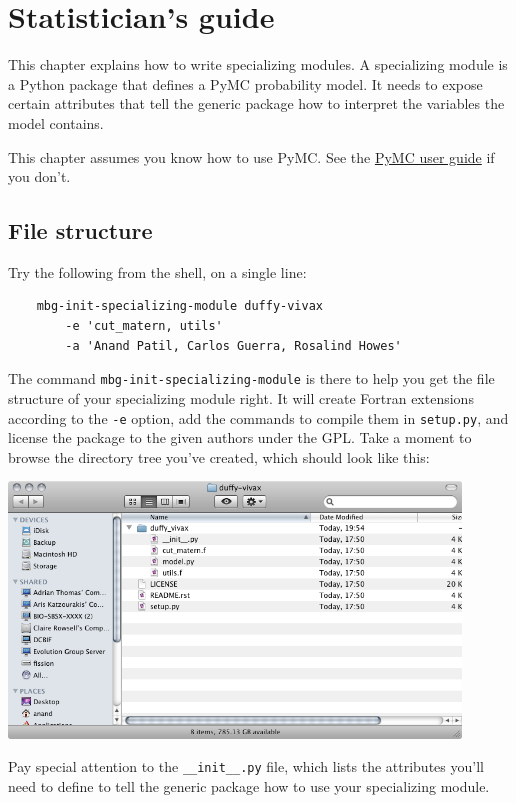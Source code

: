 \chapter{Statistician's guide} 
\label{chap:stat}

This chapter explains how to write specializing modules. A specializing module is a Python package that defines a PyMC probability model. It needs to expose certain attributes that tell the generic package how to interpret the variables the model contains.

This chapter assumes you know how to use PyMC. See the \href{http://code.google.com/p/pymc/}{PyMC user guide} if you don't.




\section{File structure} 
Try the following from the shell, on a single line:
\begin{verbatim}
    mbg-init-specializing-module duffy-vivax 
        -e 'cut_matern, utils' 
        -a 'Anand Patil, Carlos Guerra, Rosalind Howes'
\end{verbatim}
The command \texttt{mbg-init-specializing-module} is there to help you get the file structure of your specializing module right. It will create Fortran extensions according to the \texttt{-e} option, add the commands to compile them in \texttt{setup.py}, and license the package to the given authors under the GPL. Take a moment to browse the directory tree you've created, which should look like this:
\begin{center}
\includegraphics[width=12cm]{filestructure.png}     
\end{center}
Pay special attention to the \texttt{\_\_init\_\_.py} file, which lists the attributes you'll need to define to tell the generic package how to use your specializing module.

